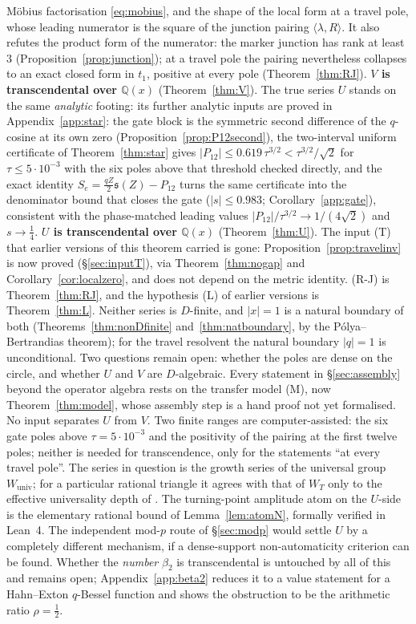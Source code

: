 \documentclass[11pt]{article}
\theoremstyle{plain}
\theoremstyle{definition}
\theoremstyle{remark}
\newcommand{\Q}{\mathbb{Q}}
\begin{document}
M\"obius factorisation \eqref{eq:mobius}, and the shape of the local form at a travel pole, whose
leading numerator is the square of the junction pairing $\langle\lambda,R\rangle$. It
also refutes the product form of the numerator: the marker junction has rank at least $3$
(Proposition~\ref{prop:junction}); at a travel pole the pairing nevertheless collapses to an exact
closed form in $t_1$, positive at every pole (Theorem~\ref{thm:RJ}). \textbf{$V$ is transcendental
over $\Q(x)$} (Theorem~\ref{thm:V}). The true series $U$ stands on the same
\emph{analytic} footing: its further analytic inputs are proved in Appendix~\ref{app:star}: the gate block is the
symmetric second difference of the $q$-cosine at its own zero (Proposition~\ref{prop:P12second}),
the two-interval uniform certificate of Theorem~\ref{thm:star} gives
$|P_{12}|\le0.619\,\tau^{3/2}<\tau^{3/2}/\sqrt2$ for $\tau\le5\cdot10^{-3}$ with the six poles
above that threshold checked directly, and the exact identity $S_e=\tfrac{qZ}2\mathfrak s(Z)-P_{12}$ turns the
same certificate into the denominator bound that closes the gate
($|s|\le0.983$; Corollary~\ref{app:gate}), consistent with the phase-matched leading
values $|P_{12}|/\tau^{3/2}\to1/(4\sqrt2)$ and $s\to\tfrac14$.
\textbf{$U$ is transcendental over $\Q(x)$} (Theorem~\ref{thm:U}). The input
\textup{(T)} that earlier versions of this theorem carried is gone: Proposition~\ref{prop:travelinv}
is now proved (\S\ref{sec:inputT}), via Theorem~\ref{thm:nogap} and Corollary~\ref{cor:localzero},
and does not depend on the metric identity. \textup{(R-J)} is
Theorem~\ref{thm:RJ}, and the hypothesis \textup{(L)} of earlier versions is Theorem~\ref{thm:L}. Neither series is $D$-finite,
and $|x|=1$ is a natural boundary of both (Theorems~\ref{thm:nonDfinite} and~\ref{thm:natboundary},
by the P\'olya--Bertrandias theorem); for the travel resolvent the natural boundary $|q|=1$ is
unconditional. Two questions remain open: whether the poles are dense on the circle, and whether
$U$ and $V$ are $D$-algebraic.
Every statement in \S\ref{sec:assembly} beyond the operator algebra rests on the transfer model
\textup{(M)}, now Theorem~\ref{thm:model}, whose assembly step is a hand proof not yet formalised.
No input separates $U$ from $V$. Two finite ranges are computer-assisted: the six gate poles above
$\tau=5\cdot10^{-3}$ and the positivity of the pairing at the first twelve poles; neither is
needed for transcendence, only for the statements ``at every travel pole''. The series in question
is the growth series of the universal group $W_{\mathrm{univ}}$; for a particular rational triangle
it agrees with that of $W_T$ only to the effective universality depth of \cite{Bonfioli2026a}.
The turning-point amplitude atom on the $U$-side is the elementary rational bound
of Lemma~\ref{lem:atomN}, formally verified in Lean~4. The independent mod-$p$ route of
\S\ref{sec:modp} would settle $U$ by a completely different mechanism, if a dense-support
non-automaticity criterion can be found. Whether the \emph{number} $\beta_2$ is transcendental is
untouched by all of this and remains open; Appendix~\ref{app:beta2} reduces it to a value statement
for a Hahn--Exton $q$-Bessel function and shows the obstruction to be the arithmetic ratio
$\rho=\tfrac12$.
\end{document}
